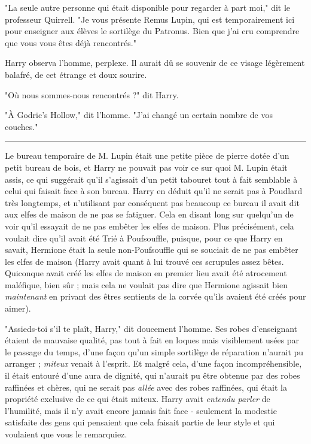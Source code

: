 "La seule autre personne qui était disponible pour regarder à part moi," dit le professeur Quirrell. "Je vous présente Remus Lupin, qui est temporairement ici pour enseigner aux élèves le sortilège du Patronus. Bien que j'ai cru comprendre que vous vous êtes déjà rencontrés."

Harry observa l'homme, perplexe. Il aurait dû se souvenir de ce visage légèrement balafré, de cet étrange et doux sourire.

"Où nous sommes-nous rencontrés ?" dit Harry.

"À Godric's Hollow," dit l'homme. "J'ai changé un certain nombre de vos couches."
\par\noindent\rule{\textwidth}{0.4pt}
Le bureau temporaire de M. Lupin était une petite pièce de pierre dotée d'un petit bureau de bois, et Harry ne pouvait pas voir ce sur quoi M. Lupin était assis, ce qui suggérait qu'il s'agissait d'un petit tabouret tout à fait semblable à celui qui faisait face à son bureau. Harry en déduit qu'il ne serait pas à Poudlard très longtemps, et n'utilisant par conséquent pas beaucoup ce bureau il avait dit aux elfes de maison de ne pas se fatiguer. Cela en disant long sur quelqu'un de voir qu'il essayait de ne pas embêter les elfes de maison. Plus précisément, cela voulait dire qu'il avait été Trié à Poufsouffle, puisque, pour ce que Harry en savait, Hermione était la seule non-Poufsouffle qui se souciait de ne pas embêter les elfes de maison (Harry avait quant à lui trouvé ces scrupules assez bêtes. Quiconque avait créé les elfes de maison en premier lieu avait été atrocement maléfique, bien sûr ; mais cela ne voulait pas dire que Hermione agissait bien \emph{maintenant}  en privant des êtres sentients de la corvée qu'ils avaient été créés pour aimer).

"Assieds-toi s'il te plaît, Harry," dit doucement l'homme. Ses robes d'enseignant étaient de mauvaise qualité, pas tout à fait en loques mais visiblement usées par le passage du temps, d'une façon qu'un simple sortilège de réparation n'aurait pu arranger ; \emph{miteux}  venait à l'esprit. Et malgré cela, d'une façon incompréhensible, il était entouré d'une aura de dignité, qui n'aurait pu être obtenue par des robes raffinées et chères, qui ne serait pas \emph{allée}  avec des robes raffinées, qui était la propriété exclusive de ce qui était miteux. Harry avait \emph{entendu parler}  de l'humilité, mais il n'y avait encore jamais fait face - seulement la modestie satisfaite des gens qui pensaient que cela faisait partie de leur style et qui voulaient que vous le remarquiez.

